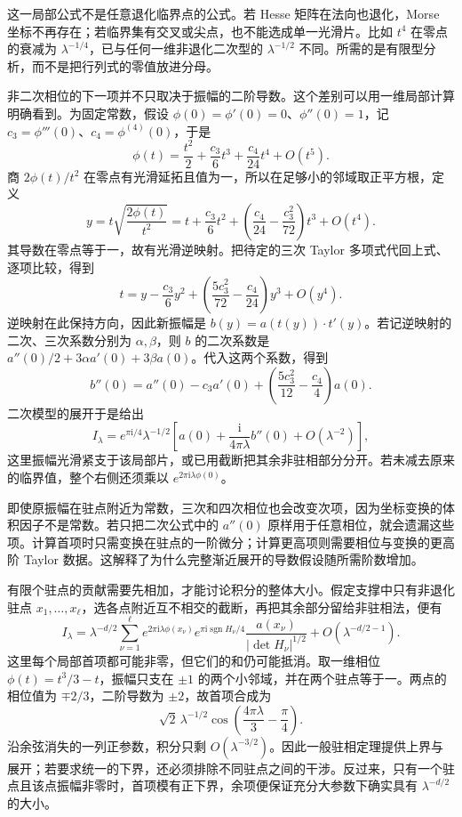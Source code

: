 \ProseParagraphBreak

这一局部公式不是任意退化临界点的公式。若 Hesse 矩阵在法向也退化，Morse 坐标不再存在；若临界集有交叉或尖点，也不能选成单一光滑片。比如 \(t^4\) 在零点的衰减为 \(\lambda^{-1/4}\)，已与任何一维非退化二次型的 \(\lambda^{-1/2}\) 不同。所需的是有限型分析，而不是把行列式的零值放进分母。

\ProseParagraphBreak

非二次相位的下一项并不只取决于振幅的二阶导数。这个差别可以用一维局部计算明确看到。为固定常数，假设
\(\phi(0)=\phi'(0)=0\)、\(\phi''(0)=1\)，记
\(c_3=\phi'''(0)\)、\(c_4=\phi^{(4)}(0)\)，于是
\[
 \phi(t)=\frac{t^2}2+\frac{c_3}6t^3+\frac{c_4}{24}t^4+O(t^5).
\]
商 \(2\phi(t)/t^2\) 在零点有光滑延拓且值为一，所以在足够小的邻域取正平方根，定义
\[
 y=t\sqrt{\frac{2\phi(t)}{t^2}}
   =t+\frac{c_3}{6}t^2
       +\left(\frac{c_4}{24}-\frac{c_3^2}{72}\right)t^3+O(t^4).
\]
其导数在零点等于一，故有光滑逆映射。把待定的三次 Taylor 多项式代回上式、逐项比较，得到
\[
 t=y-\frac{c_3}6y^2+
           \left(\frac{5c_3^2}{72}-\frac{c_4}{24}\right)y^3+O(y^4).
\]
逆映射在此保持方向，因此新振幅是
\(b(y)=a(t(y))\cdot t'(y)\)。若记逆映射的二次、三次系数分别为 \(\alpha,\beta\)，则 \(b\) 的二次系数是
\(a''(0)/2+3\alpha a'(0)+3\beta a(0)\)。代入这两个系数，得到
\[
 b''(0)=a''(0)-c_3a'(0)
 +\left(\frac{5c_3^2}{12}-\frac{c_4}4\right)a(0).
\]
二次模型的展开于是给出
\[
 I_\lambda=e^{\pi\mathrm i/4}\lambda^{-1/2}
 \left[a(0)+\frac{\mathrm i}{4\pi\lambda}b''(0)
 +O(\lambda^{-2})\right],
\]
这里振幅光滑紧支于该局部片，或已用截断把其余非驻相部分分开。若未减去原来的临界值，整个右侧还须乘以 \(e^{2\pi\mathrm i\lambda\phi(0)}\)。

\ProseParagraphBreak

即使原振幅在驻点附近为常数，三次和四次相位也会改变次项，因为坐标变换的体积因子不是常数。若只把二次公式中的 \(a''(0)\) 原样用于任意相位，就会遗漏这些项。计算首项时只需变换在驻点的一阶微分；计算更高项则需要相位与变换的更高阶 Taylor 数据。这解释了为什么完整渐近展开的导数假设随所需阶数增加。

\ProseParagraphBreak

有限个驻点的贡献需要先相加，才能讨论积分的整体大小。假定支撑中只有非退化驻点 \(x_1,\ldots,x_\ell\)，选各点附近互不相交的截断，再把其余部分留给非驻相法，便有
\[
 I_\lambda=\lambda^{-d/2}\sum_{\nu=1}^{\ell}
 e^{2\pi\mathrm i\lambda\phi(x_\nu)}
 e^{\pi\mathrm i\operatorname{sgn}H_\nu/4}
 \frac{a(x_\nu)}{|\det H_\nu|^{1/2}}
 +O(\lambda^{-d/2-1}).
\]
这里每个局部首项都可能非零，但它们的和仍可能抵消。取一维相位 \(\phi(t)=t^3/3-t\)，振幅只支在 \(\pm1\) 的两个小邻域，并在两个驻点等于一。两点的相位值为 \(\mp2/3\)，二阶导数为 \(\pm2\)，故首项合成为
\[
 \sqrt2\,\lambda^{-1/2}
 \cos\left(\frac{4\pi\lambda}{3}-\frac\pi4\right).
\]
沿余弦消失的一列正参数，积分只剩 \(O(\lambda^{-3/2})\)。因此一般驻相定理提供上界与展开；若要求统一的下界，还必须排除不同驻点之间的干涉。反过来，只有一个驻点且该点振幅非零时，首项模有正下界，余项便保证充分大参数下确实具有 \(\lambda^{-d/2}\) 的大小。

